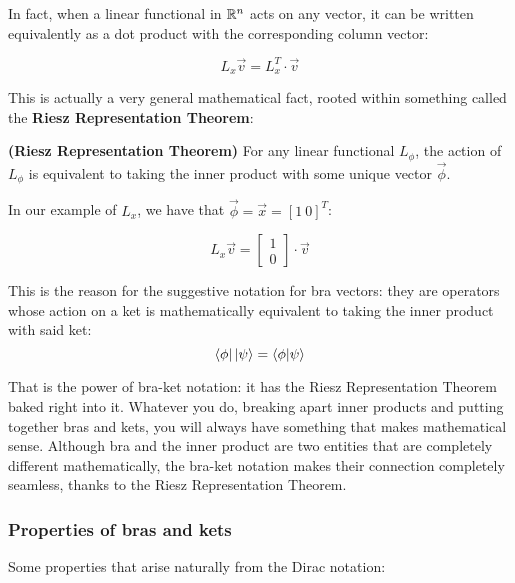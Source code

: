 In fact, when a linear functional in $\mathbb{R}^n$ acts on any vector, it can be written equivalently as a dot product with the corresponding column vector:

\begin{equation}
    L_x \vec{v} = L_x^T\cdot \vec{v}
\end{equation}

This is actually a very general mathematical fact, rooted within something called the \textbf{Riesz Representation Theorem}:

\begin{theorem}
    \textbf{(Riesz Representation Theorem)} For any linear functional $L_\phi$, the action of $L_\phi$ is equivalent to taking the inner product with some unique vector $\vec{\phi}$.
\end{theorem}

In our example of $L_x$, we have that $\vec{\phi} = \vec{x} = [1\ 0]^T$:

\begin{equation}
    L_x\vec{v} = \begin{bmatrix}
        1 \\ 0
    \end{bmatrix}\cdot \vec{v}    
\end{equation}

This is the reason for the suggestive notation for bra vectors: they are operators whose action on a ket is mathematically equivalent to taking the inner product with said ket:
\begin{equation}
    \bra{\phi}\ket{\psi} = \braket{\phi|\psi}
\end{equation}

That is the power of bra-ket notation: it has the Riesz Representation Theorem baked right into it. Whatever you do, breaking apart inner products and putting together bras and kets, you will always have something that makes mathematical sense. Although bra and the inner product are two entities that are completely different mathematically, the bra-ket notation makes their connection completely seamless, thanks to the Riesz Representation Theorem.


\subsubsection{Properties of bras and kets}

Some properties that arise naturally from the Dirac notation:

